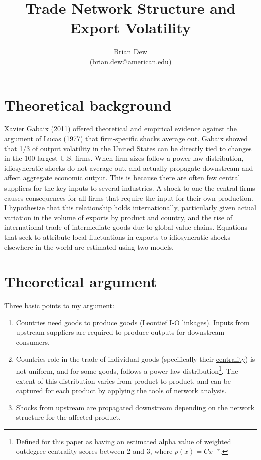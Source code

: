 \documentclass[10pt,letterpaper]{article}
\author{Brian Dew\\ (brian.dew@american.edu)}
\title{Trade Network Structure and Export Volatility}
\begin{document}
\maketitle

\section{Theoretical background}
Xavier Gabaix (2011) offered theoretical and empirical evidence against the argument of Lucas (1977) that firm-specific shocks average out. Gabaix showed that 1/3 of output volatility in the United States can be directly tied to changes in the 100 largest U.S. firms. When firm sizes follow a power-law distribution, idiosyncratic shocks do not average out, and actually propagate downstream and affect aggregate economic output. This is because there are often few central suppliers for the key inputs to several industries. A shock to one the central firms causes consequences for all firms that require the input for their own production. I hypothesize that this relationship holds internationally, particularly given actual variation in the volume of exports by product and country, and the rise of international trade of intermediate goods due to global value chains. Equations that seek to attribute local fluctuations in exports to idiosyncratic shocks elsewhere in the world are estimated using two models. 

\section{Theoretical argument}
Three basic points to my argument:

\begin{enumerate}
\item Countries need goods to produce goods (Leontief I-O linkages). Inputs from upstream suppliers are required to produce outputs for downstream consumers.
\item Countries role in the trade of individual goods (specifically their \href{https://en.wikipedia.org/wiki/Centrality}{centrality}) is not uniform, and for some goods, follows a power law distribution\footnote{Defined for this paper as having an estimated alpha value of weighted outdegree centrality scores between 2 and 3, where $p(x) = Cx^{-\alpha}$.}. The extent of this distribution varies from product to product, and can be captured for each product by applying the tools of network analysis.
\item Shocks from upstream are propagated downstream depending on the network structure for the affected product. 
\end{enumerate}
\end{document}
